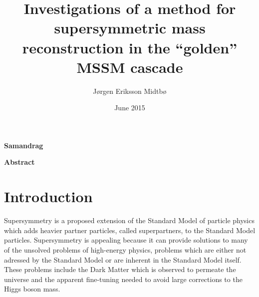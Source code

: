 \documentclass[twoside,english]{uiofysmaster}
\author{J\o rgen Eriksson Midtb\o}
\title{Investigations of a method for supersymmetric mass reconstruction in the ``golden'' MSSM cascade}
\date{June 2015}
\newenvironment{abstractpage}
  {\cleardoublepage\vspace*{\fill}\thispagestyle{empty}}
  {\vfill\cleardoublepage}
\renewenvironment{abstract}[1]
  {\bigskip\selectlanguage{#1}%
   }
  {\par\bigskip}
\begin{document}

\cleardoublepage

\begin{abstractpage}

\begin{center}
	\textbf{Samandrag}
\end{center}
\begin{abstract}{norsk}
    \lipsum[1]
\end{abstract}

\begin{center}
	\textbf{Abstract}
\end{center}
\begin{abstract}{english}
    \lipsum[1]
\end{abstract}

\end{abstractpage}


\begin{dedication}
\end{dedication}


\tableofcontents
\listoffigures
\listoftables


\chapter*{Introduction}
Supersymmetry is a proposed extension of the Standard Model of particle physics which adds heavier partner particles, called superpartners, to the Standard Model particles. Supersymmetry is appealing because it can provide solutions to many of the unsolved problems of high-energy physics, problems which are either not adressed by the Standard Model or are inherent in the Standard Model itself. These problems include the Dark Matter which is observed to permeate the universe and the apparent fine-tuning needed to avoid large corrections to the Higgs boson mass.
\end{document}
